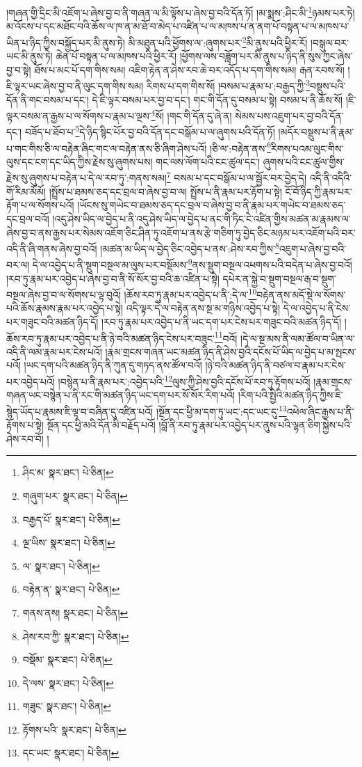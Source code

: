 །གཞན་གྱི་དྲིང་མི་འཇོག་པ་ཞེས་བྱ་བ་ནི་གཞན་ལ་མི་ལྟོས་པ་ཞེས་བྱ་བའི་དོན་ཏོ། །མ་སྨས་:ཤིང་མི་\footnote{ཤིང་མ་  སྣར་ཐང་།  པེ་ཅིན། }ཉམས་པར་ཏེ། མ་འོངས་པ་དང་མཐོང་བའི་ཆོས་ལ་ཁ་ན་མ་ཐོ་བ་མེད་པ་འཛིན་པ་ལ་མཁས་པ་ན་ནག་པོ་བསྟན་པ་ལ་མཁས་པ་ཡིན་པ་ཉིད་ཀྱིས་བསྐྱོད་པར་མི་ནུས་ཏེ། མི་མཐུན་པའི་ཕྱོགས་ལ་:ཞུགས་པར་\footnote{གཞུག་པར་  སྣར་ཐང་།  པེ་ཅིན། }མི་ནུས་པའི་ཕྱིར་རོ། །བསྒུལ་བར་ཡང་མི་ནུས་ཏེ། ཆེན་པོ་བསྟན་པ་ལ་མཁས་པའི་ཕྱིར་རོ། །ཕྱོགས་ལས་བཟློག་པར་མི་ནུས་པ་ཉིད་ནི་སུས་ཀྱང་ཞེས་བྱ་བ་སྟེ། ཐོས་པ་མང་པོ་དག་གིས་སམ། འཇིག་རྟེན་ན་ཤེས་རབ་ཆེ་བར་འདོད་པ་དག་གིས་སམ། རྒན་རབས་སོ། །ཇི་ལྟར་ཡང་ཞེས་བྱ་བ་ནི་ལུང་དག་གིས་སམ། རིགས་པ་དག་གིས་སོ། །བསམ་པ་རྣམ་པ་:བརྒྱད་ཀྱི་\footnote{བརྒྱད་པོ་  སྣར་ཐང་།  པེ་ཅིན། }བསྡུས་པའི་དོན་ནི་གང་བསམ་པ་དང་། དེ་ཇི་ལྟར་བསམ་པར་བྱ་བ་དང་། གང་གི་དོན་དུ་བསམ་པ་སྟེ། བསམ་པ་ནི་ཆོས་སོ། །ཇི་ལྟར་བསམ་ན་རྒྱས་པ་ལ་སོགས་པ་རྣམ་པ་ལྔས་\footnote{ལྔ་ཡིས་  སྣར་ཐང་།  པེ་ཅིན། }སོ། །གང་གི་དོན་དུ་ཞེ་ན། སེམས་པས་འཇུག་པར་བྱ་བའི་དོན་དང་། བཟོད་པ་ཐོབ་པ་\footnote{ལ་  སྣར་ཐང་།  པེ་ཅིན། }དེ་ཉིད་སྙིང་པོར་བྱ་བའི་དོན་དང་བསྒོམ་པ་ལ་ཞུགས་པའི་དོན་ཏོ། །མདོར་བསྡུས་པ་ནི་རྣམ་པ་གང་གིས་ཅི་ལ་བརྟེན་ཞིང་གང་ལ་བརྟེན་ནས་ཅི་ཞིག་ཤེས་པའོ། །ཅི་ལ་:བརྟེན་ནས་\footnote{བརྟེན་ན་  སྣར་ཐང་།  པེ་ཅིན། }རིགས་པའམ་ལུང་གིས་ལུས་དང་ངག་དང་ཡིད་ཀྱིས་རྗེས་སུ་ཞུགས་པས། གང་ལས་ལོག་པའི་ངང་ཚུལ་དང་། ཞུགས་པའི་ངང་ཚུལ་གྱིས་རྗེས་སུ་ཞུགས་པ་བརྟེན་པ་དེ་ལ་རབ་ཏུ་:གནས་སམ།\footnote{གནས་ནས།  སྣར་ཐང་།  པེ་ཅིན། } བསམ་པ་དང་བསྒོམ་པ་ལ་སྦྱོར་བར་བྱེད་དེ། འདི་ནི་འདིའི་གོ་རིམ་མོམོ། །སྤྲོས་པ་ཐམས་ཅད་དང་བྲལ་བ་ཞེས་བྱ་བ་ལ། སྤྲོས་པ་ནི་རྣམ་པར་རྟོག་པ་སྟེ། ངོ་བོ་ཉིད་ཀྱི་རྣམ་པར་རྟོག་པ་ལ་སོགས་པའོ། །ཡོངས་སུ་གཡེང་བ་ཐམས་ཅད་དང་བྲལ་བ་ཞེས་བྱ་བ་ནི་རྣམ་པར་གཡེང་བ་ཐམས་ཅད་དང་བྲལ་བའོ། །འདུ་ཤེས་ཡིད་ལ་བྱེད་པ་ནི་འདུ་ཤེས་ཡིད་ལ་བྱེད་པ་ནང་གི་ཏིང་ངེ་འཛིན་གྱིས་མཚན་མ་རྣམས་ལ་ཞེས་བྱ་བ་ནས་རྒྱས་པར་སེམས་འཇོག་ཅིང་ཤིན་ཏུ་འཇོག་པ་ནས་རྩེ་གཅིག་ཏུ་བྱེད་ཅིང་མཉམ་པར་འཇོག་པའི་བར་འདི་ནི་ཞི་གནས་ཞེས་བྱ་བའོ། །མཚན་མ་ཡིད་ལ་བྱེད་ཅིང་འབྱེད་པ་ནས་:ཤེས་རབ་ཀྱིས་\footnote{ཤེས་རབ་ཀྱི་  སྣར་ཐང་།  པེ་ཅིན། }འཇུག་པ་ཞེས་བྱ་བའི་བར་ལ། དེ་ལ་འབྱེད་པ་ནི་སྡུག་བསྔལ་མ་ལུས་པར་བསྡོམས་\footnote{བསྡོམ་  སྣར་ཐང་།  པེ་ཅིན། }ནས་སྡུག་བསྔལ་འཕགས་པའི་བདེན་པ་ཞེས་བྱ་བའོ། །རབ་ཏུ་རྣམ་པར་འབྱེད་པ་ཞེས་བྱ་བ་ནི་སོ་སོར་བྱ་བའི་ཆ་འཛིན་པ་སྟེ། དཔེར་ན་སྐྱེ་བ་སྡུག་བསྔལ་རྒ་བ་སྡུག་བསྔལ་ཞེས་བྱ་བ་ལ་སོགས་པ་ལྟ་བུའོ། །ཆོས་རབ་ཏུ་རྣམ་པར་འབྱེད་པ་ནི་:དེ་ལ་\footnote{དེ་ལས་  སྣར་ཐང་།  པེ་ཅིན། }བརྟེན་ནས་མདོ་སྡེ་ལ་སོགས་པའི་ཆོས་རྣམས་རྣམ་པར་འབྱེད་པ་སྟེ། འདི་ལྟར་དེ་ལ་བརྟེན་ནས་སྔ་མ་གཉིས་འབྱེད་པ་སྟེ། དེ་ལ་འབྱེད་པ་ནི་ངེས་པར་གཟུང་བའི་མཚན་ཉིད་དོ། །རབ་ཏུ་རྣམ་པར་འབྱེད་པ་ནི་ཡང་དག་པར་ངེས་པར་གཟུང་བའི་མཚན་ཉིད་དོ། །ཆོས་རབ་ཏུ་རྣམ་པར་འབྱེད་པ་ནི་ཉེ་བའི་མཚན་ཉིད་ངེས་པར་བཟུང་\footnote{གཟུང་  སྣར་ཐང་།  པེ་ཅིན། }བའོ། །དེ་ལ་སྔ་མས་ནི་ལམ་ཚོལ་བ་ཡིན་ལ་འདི་ནི་ལམ་རྣམ་པར་ངེས་པའོ། །རྣམ་གྲངས་གཞན་ཡང་མཚན་ཉིད་ནི་ཤེས་བྱའི་དངོས་པོ་ཡིད་ལ་བྱེད་པ་མ་སྤངས་པའོ། །ཡང་དག་པའི་མཚན་ཉིད་ནི་ཀུན་དུ་གཏད་ནས་ཚོལ་བའོ། །ཉེ་བའི་མཚན་ཉིད་ནི་བཙལ་བ་རྣམ་པར་ངེས་པར་འབྱེད་པའོ། །བསྙེན་པ་ནི་རྣམ་པར་:འབྱེད་པའི་\footnote{རྟོགས་པའི་  སྣར་ཐང་།  པེ་ཅིན། }ལུས་ཀྱི་ཤེས་བྱའི་དངོས་པོ་རབ་ཏུ་རྟོགས་པའོ། །རྣམ་གྲངས་གཞན་ཡང་བསྙེན་པ་ནི་རང་གི་མཚན་ཉིད་ཡང་དག་པར་སོ་སོར་རིག་པའོ། །རིག་པའི་སྤྱིའི་མཚན་ཉིད་ཀྱིས་ཇི་སྙེད་ཡོད་པ་རྣམས་ཇི་ལྟ་བ་བཞིན་དུ་འཛིན་པའོ། །སྔོན་དང་ཕྱི་མ་དག་ཏུ་ཡང་:དང་ཡང་དུ་\footnote{དང་ཡང་  སྣར་ཐང་།  པེ་ཅིན། }འཕེལ་ཞིང་རྒྱས་པ་ནི་རྟོགས་པ་སྟེ། སྔོན་དང་ཕྱི་མའི་དོན་མི་བརྗོད་པའོ། །བློ་ནི་རབ་ཏུ་རྣམ་པར་འབྱེད་པར་ནུས་པའི་ལྷན་ཅིག་སྐྱེས་པའི་ཤེས་རབ་བོ། །
